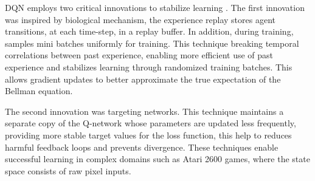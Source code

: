\documentclass[12pt,a4paper]{report}
\begin{document}
DQN employs two critical innovations to stabilize learning \cite{chiave7}. The first innovation was inspired by biological mechanism, the experience replay stores agent transitions, at each time-step, in a replay buffer. In addition, during training, samples mini batches uniformly for training. This technique breaking temporal correlations between past experience, enabling more efficient use of past experience and stabilizes learning through randomized training batches. This allows gradient updates to better approximate the true expectation of the Bellman equation. 

The second innovation was targeting networks. This technique maintains a separate copy of the Q-network whose parameters are updated less frequently, providing more stable target values for the loss function, this help to reduces harmful feedback loops and prevents divergence.  These techniques enable successful learning in complex domains such as Atari 2600 games, where the state space consists of raw pixel inputs.
\end{document}
